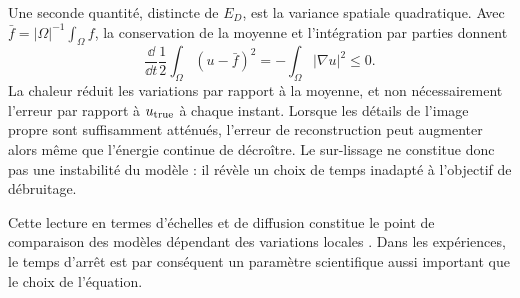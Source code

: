 Une seconde quantité, distincte de $E_D$, est la variance spatiale
quadratique. Avec $\bar f=|\Omega|^{-1}\int_\Omega f$, la conservation de
la moyenne et l'intégration par parties donnent
\begin{equation}
 \frac{\dd}{\dd t}\frac12\int_\Omega (u-\bar f)^2
 =-\int_\Omega |\nabla u|^2\leq0.
 \label{eq:heat-variance}
\end{equation}
La chaleur réduit les variations par rapport à la moyenne, et non
nécessairement l'erreur par rapport à $u_{\mathrm{true}}$ à chaque instant. Lorsque
les détails de l'image propre sont suffisamment atténués, l'erreur de
reconstruction peut augmenter alors même que l'énergie continue de
décroître. Le sur-lissage ne constitue donc pas une instabilité du
modèle : il révèle un choix de temps inadapté à l'objectif de débruitage.

Cette lecture en termes d'échelles et de diffusion constitue le point
de comparaison des modèles dépendant des variations locales
\cite{weickert1998}. Dans les expériences, le temps d'arrêt est par
conséquent un paramètre scientifique aussi important que le choix de
l'équation.
